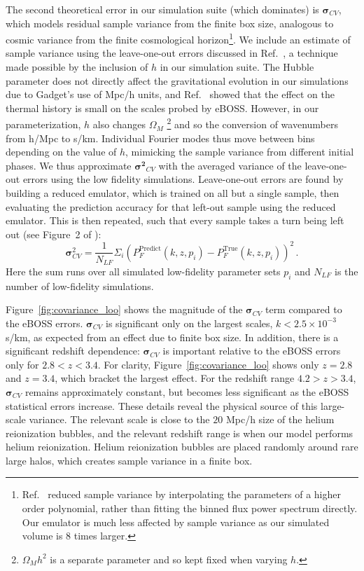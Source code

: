 The second theoretical error in our simulation suite (which dominates) is $\boldsymbol{\sigma}_{CV}$, which models residual sample variance from the finite box size, analogous to cosmic variance from the finite cosmological horizon\footnote{Ref.~\cite{2023ApJ...944..223P} reduced sample variance by interpolating the parameters of a higher order polynomial, rather than fitting the binned flux power spectrum directly.
Our emulator is much less affected by sample variance as our simulated volume is $8$ times larger.}.
We include an estimate of sample variance using the leave-one-out errors discussed in Ref.~\cite{2023simsuite}, a technique made possible by the inclusion of $h$ in our simulation suite.
The Hubble parameter does not directly affect the gravitational evolution in our simulations due to Gadget's use of Mpc/h units, and Ref.~\cite{2023simsuite} showed that the effect on the thermal history is small on the scales probed by eBOSS.
However, in our parameterization, $h$ also changes $\Omega_M$ \footnote{$\Omega_M h^2$ is a separate parameter and so kept fixed when varying $h$.} and so the conversion of wavenumbers from h/Mpc to s/km.
Individual Fourier modes thus move between bins depending on the value of $h$, mimicking the sample variance from different initial phases.
We thus approximate $\boldsymbol{\sigma^2}_{CV}$ with the averaged variance of the leave-one-out errors using the low fidelity simulations.
Leave-one-out errors are found by building a reduced emulator, which is trained on all but a single sample, then evaluating the prediction accuracy for that left-out sample using the reduced emulator.
This is then repeated, such that every sample takes a turn being left out (see Figure~2 of \cite{2023simsuite}):
\begin{equation}
    \boldsymbol{\sigma}^2_{CV}  = \frac{1}{N_{LF}}\Sigma_i \left(P_F^\mathrm{Predict}(k, z, p_i) - P_F^\mathrm{True}(k, z, p_i)\right)^2\,.
\end{equation}
Here the sum runs over all simulated low-fidelity parameter sets $p_i$ and $N_{LF}$ is the number of low-fidelity simulations.

Figure~\ref{fig:covariance_loo} shows the magnitude of the $\boldsymbol{\sigma}_{CV}$ term compared to the eBOSS errors.
$\boldsymbol{\sigma}_{CV}$ is significant only on the largest scales, $k < 2.5 \times 10^{-3}$ s/km, as expected from an effect due to finite box size.
In addition, there is a significant redshift dependence: $\boldsymbol{\sigma}_{CV}$ is important relative to the eBOSS errors only for $2.8 < z < 3.4$.
For clarity, Figure~\ref{fig:covariance_loo} shows only $z=2.8$ and $z=3.4$, which bracket the largest effect. For the redshift range $4.2 > z>3.4$, $\boldsymbol{\sigma}_{CV}$ remains approximately constant, but becomes less significant as the eBOSS statistical errors increase.
These details reveal the physical source of this large-scale variance.
The relevant scale is close to the $20$ Mpc/h size of the helium reionization bubbles, and the relevant redshift range is when our model performs helium reionization.
Helium reionization bubbles are placed randomly around rare large halos, which creates sample variance in a finite box. 

